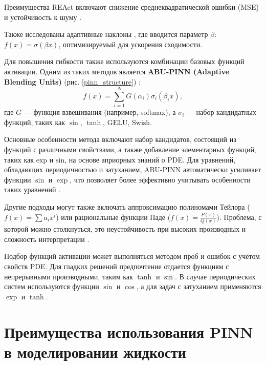 Преимущества REAct включают снижение среднеквадратической ошибки (MSE) и устойчивость к шуму
\cite{0d752c79fb816703274a3d37f85a85689a2a9405}.

Также исследованы адаптивные наклоны \cite{7fcd4b3c875d8e41eb0c184aa1a42bf4c8906d61}, где вводится параметр
$\beta$: $f(x) = \sigma(\beta x)$, оптимизируемый для ускорения сходимости.

Для повышения гибкости также используются комбинации базовых функций активации. Одним из таких методов является
\textbf{ABU-PINN (Adaptive Blending Units)} (рис. \ref{pinn_structure}) \cite{Sutfeld2018-io}\cite{7fcd4b3c875d8e41eb0c184aa1a42bf4c8906d61}:
\begin{equation}
    f(x) = \sum_{i=1}^N G(\alpha_i) \sigma_i(\beta_i x),
    \label{eq:abu}
\end{equation}
где $G$ — функция взвешивания (например, softmax), а $\sigma_i$ — набор кандидатных функций, таких как
$\sin$, $\tanh$, $\mathrm{GELU}$, $\mathrm{Swish}$. 

Основные особенности метода включают набор кандидатов, состоящий из функций с различными свойствами, а
также добавление элементарных функций, таких как $\mathrm{exp}$ и $\mathrm{sin}$, на основе априорных знаний о PDE.
Для уравнений, обладающих периодичностью и затуханием, ABU-PINN автоматически усиливает функции
$\sin$ и $\exp$, что позволяет более эффективно учитывать особенности таких уравнений
\cite{7fcd4b3c875d8e41eb0c184aa1a42bf4c8906d61}.



Другие подходы могут также включать аппроксимацию полиномами Тейлора ($f(x) = \sum a_i x^i$) или
рациональные функции Паде ($f(x) = \frac{P(x)}{Q(x)}$).
Проблема, с которой можно столкнуться, это неустойчивость при высоких производных и сложность
интерпретации \cite{7fcd4b3c875d8e41eb0c184aa1a42bf4c8906d61}.

Подбор функций активации может выполняться методом проб и ошибок с учётом свойств PDE. Для гладких решений
предпочтение отдается функциям с непрерывными производными, таким как $\tanh$ и $\sin$. В случае периодических
систем используются функции $\sin$ и $\cos$, а для задач с затуханием применяются $\exp$ и $\tanh$.


\section{Преимущества использования PINN в моделировании жидкости}
